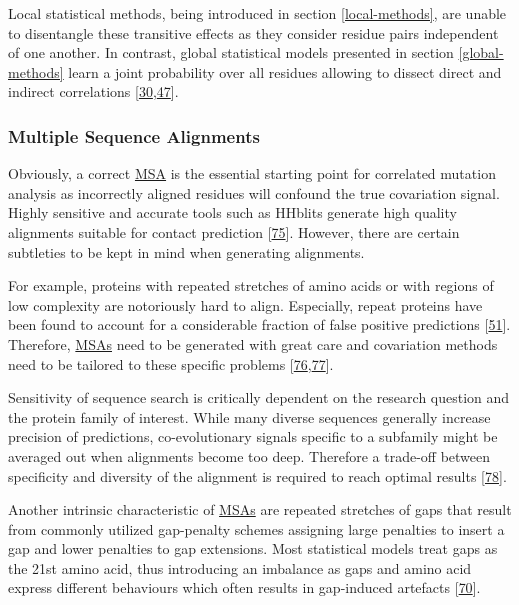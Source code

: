 \documentclass[12pt,a4paper,twoside]{book}
\theoremstyle{definition}
\theoremstyle{definition}
\theoremstyle{remark}
\begin{document}
Local statistical methods, being introduced in section
\ref{local-methods}, are unable to disentangle these transitive effects
as they consider residue pairs independent of one another. In contrast,
global statistical models presented in section \ref{global-methods}
learn a joint probability over all residues allowing to dissect direct
and indirect correlations
{[}\protect\hyperlink{ref-Weigt2009}{30},\protect\hyperlink{ref-Burger2010}{47}{]}.

\subsubsection*{Multiple Sequence
Alignments}\label{multiple-sequence-alignments}

Obviously, a correct \protect\hyperlink{abbrev}{MSA} is the essential
starting point for correlated mutation analysis as incorrectly aligned
residues will confound the true covariation signal. Highly sensitive and
accurate tools such as HHblits generate high quality alignments suitable
for contact prediction {[}\protect\hyperlink{ref-Remmert2012}{75}{]}.
However, there are certain subtleties to be kept in mind when generating
alignments.

For example, proteins with repeated stretches of amino acids or with
regions of low complexity are notoriously hard to align. Especially,
repeat proteins have been found to account for a considerable fraction
of false positive predictions
{[}\protect\hyperlink{ref-Anishchenko2017}{51}{]}. Therefore,
\protect\hyperlink{abbrev}{MSAs} need to be generated with great care
and covariation methods need to be tailored to these specific problems
{[}\protect\hyperlink{ref-Espada2014}{76},\protect\hyperlink{ref-Toth-Petroczy2016}{77}{]}.

Sensitivity of sequence search is critically dependent on the research
question and the protein family of interest. While many diverse
sequences generally increase precision of predictions, co-evolutionary
signals specific to a subfamily might be averaged out when alignments
become too deep. Therefore a trade-off between specificity and diversity
of the alignment is required to reach optimal results
{[}\protect\hyperlink{ref-Hopf2012}{78}{]}.

Another intrinsic characteristic of \protect\hyperlink{abbrev}{MSAs} are
repeated stretches of gaps that result from commonly utilized
gap-penalty schemes assigning large penalties to insert a gap and lower
penalties to gap extensions. Most statistical models treat gaps as the
21st amino acid, thus introducing an imbalance as gaps and amino acid
express different behaviours which often results in gap-induced
artefacts {[}\protect\hyperlink{ref-Feinauer2014}{70}{]}.
\end{document}
